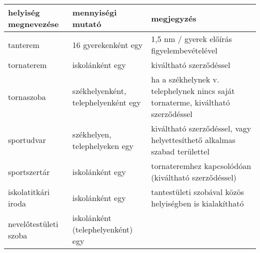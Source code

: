 \begin{spacing}{.99}
\begin{longtable}{@{}p{}|p{}|p{}@{}}

    \textbf{helyiség megnevezése} & \textbf{mennyiségi mutató}
                                  & \textbf{megjegyzés}
    \\ \hline
    tanterem                      & 16 gyerekenként egy                 &
    1,5 nm /
    gyerek előírás figyelembevételével
    \\ \hline
    tornaterem                    & iskolánként egy                     &
    kiváltható
    szerződéssel
    \\ \hline
    tornaszoba                    & székhelyenként, telephelyenként egy &
    ha a
    székhelynek v. telephelynek nincs saját tornaterme, kiváltható szerződéssel
    \\ \hline
    sportudvar                    & székhelyen, telephelyeken egy       &
    kiváltható
    szerződéssel, vagy helyettesíthető alkalmas szabad területtel
    \\ \hline
    sportszertár                  & iskolánként egy                     &
    tornateremhez kapcsolódóan (kiváltható szerződéssel)
    \\ \hline
    iskolatitkári iroda           & iskolánként egy                     &
    tantestületi szobával közös helyiségben  is kialakítható
    \\ \hline
    nevelőtestületi szoba         & iskolánként (telephelyenként) egy   &


\end{longtable}
\end{spacing}
